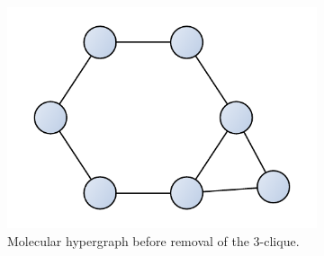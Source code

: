 \documentclass{article}
\begin{document}
\begin{figure}
    \centering
    \begin{subfigure}[b]{0.48\textwidth}
        \centering
        \includegraphics[scale=0.25]{images/mols_clique_connected.pdf}
        \caption{Molecular hypergraph before removal of the 3-clique.}
    \end{subfigure}
    \hfill
    \begin{subfigure}[b]{0.48\textwidth}
        \centering

\end{subfigure}
\end{figure}
\end{document}
